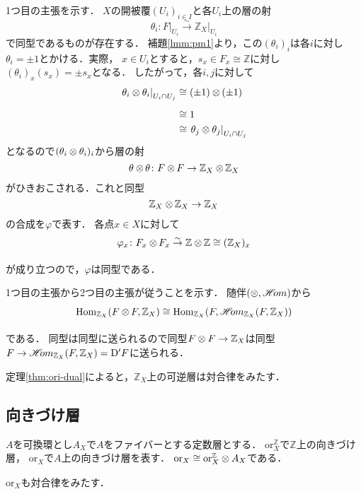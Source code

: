\documentclass[uplatex,dvipdfmx,a4paper,10pt,draft]{jsarticle}
\makeatletter
\theoremstyle{definition}
\newcommand{\ZZ}{\mathbb{Z}}
\newcommand{\Hom}{\mathop{\mathrm{Hom}}\nolimits} %
\renewenvironment{proof}[1][\proofname]{\par
  \pushQED{\qed}%
  \normalfont \topsep6\p@\@plus6\p@\relax
  \trivlist
  \item[\hskip\labelsep
         \bfseries
    {#1}]\ignorespaces
}{%
  \popQED\endtrivlist\@endpefalse
}
\renewcommand{\proofname}{証明.}
\numberwithin{equation}{section}
\newcommand{\HOM}{\mathop{\mathscr{H}\hspace{-2pt}om}\nolimits}%
\newcommand{\simar}{\mathrel{\overset{\sim}{\rightarrow}}}%
\newcommand{\rmD}{\mathrm{D}}
\newcommand{\ori}{\mathord{\mathrm{or}}}
\newcommand{\tens}[1][]{\mathbin{\otimes_{\raise1.5ex\hbox to-.1em{}{#1}}}}
\newcommand{\ttens}[1][]{\mathbin{\mathop{\overset{\mathrm{}}{\tens}}_{#1}}}
\newcommand{\mres}[2][]{{\left.{#1}\right\rvert}_{#2}}
\theoremstyle{mystyle}
\makeatother
\begin{document}
\begin{proof}[{定理\ref{thm:ori-dual}の証明}]
    1つ目の主張を示す．
    \(X\)の開被覆\((U_i)_{i\in I}\)と各\(U_i\)上の層の射
    \[
        \theta_i\colon\mres[F]{U_{i}}\simar\mres[\ZZ_X]{U_{i}}
    \]で同型であるものが存在する．
    補題\ref{lmm:pm1}より，この\((\theta_i)_{i}\)は各\(i\)に対し
    \(\theta_i=\pm1\)とかける．実際，
    \(x\in U_i\)とすると，\(s_x\in F_x\cong\ZZ\)に対し\(
        (\theta_{i})_x(s_x)=\pm{s_x}
    \)となる．
    したがって，各\(i,j\)に対して    
    \begin{align*}
        \mres[\theta_{i}\otimes\theta_{i}]{{U_{i}\cap U_{j}}}
        &\cong
        (\pm1)\ttens[](\pm1)\\
        &\cong
        1\\
        &\cong
        \mres[\theta_{j}\otimes\theta_{j}]{{U_{i}\cap U_{j}}}
    \end{align*}
    となるので\((\theta_i\ttens[]\theta_i)_i\)から層の射
    \[
        \theta\tens[]\theta\colon F\tens[]F
        \to\ZZ_X\tens[]\ZZ_X
    \]
    がひきおこされる．これと同型
    \[
        \ZZ_X\tens[]\ZZ_X\to\ZZ_X
    \]
    の合成を\(\varphi\)で表す．
    各点\(x\in X\)に対して
    \[
        \varphi_x\colon F_x\ttens[]F_x\simar\ZZ\ttens[]\ZZ\cong(\ZZ_{X})_x
    \]が成り立つので，\(\varphi\)は同型である．

    1つ目の主張から2つ目の主張が従うことを示す．
    随伴\((\ttens[],\HOM)\)から
    \begin{align*}
        \Hom_{\ZZ_X}(F\ttens[]F,\ZZ_X)
        \cong
        \Hom_{\ZZ_X}(F,\HOM_{\ZZ_X}(F,\ZZ_X))
    \end{align*}
    である．
    同型は同型に送られるので同型\(
        F\ttens[]F\to \ZZ_X
    \)は同型\(F\to\HOM_{\ZZ_X}(F,\ZZ_X)=\rmD'F\)に送られる．
\end{proof}

定理\ref{thm:ori-dual}によると，\(\ZZ_X\)上の可逆層は対合律をみたす．
\subsection{向きづけ層}

\(A\)を可換環とし\(A_X\)で\(A\)をファイバーとする定数層とする．
\(\ori_{X}^{\ZZ}\)で\(\ZZ\)上の向きづけ層，
\(\ori_X\)で\(A\)上の向きづけ層を表す．
\(\ori_X\cong\ori^{\ZZ}_{X}\ttens[]A_X\)である．

\(\ori_X\)も対合律をみたす．
\end{document}
